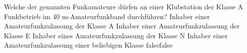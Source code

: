     {Welche der genannten Funkamateure dürfen an einer Klubstation der Klasse A Funkbetrieb im 40 m-Amateurfunkband durchführen?}
    {Inhaber einer Amateurfunkzulassung der Klasse A }
    {Inhaber einer Amateurfunkzulassung der Klasse E}
    {Inhaber eines Amateurfunkzulassung der Klasse N}
    {Inhaber einer Amateurfunkzulassung einer beliebigen Klasse}
    {false}{false}
